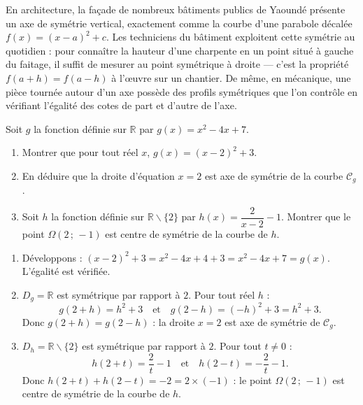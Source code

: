 \documentclass[11pt]{article}
\def\setminus{\mathbin{\backslash}}\let\smallsetminus\setminus
\begin{document}
\begin{savaistu}
En architecture, la façade de nombreux bâtiments publics de Yaoundé présente un axe de symétrie vertical, exactement comme la courbe d'une parabole décalée $f(x) = (x-a)^2 + c$. Les techniciens du bâtiment exploitent cette symétrie au quotidien : pour connaître la hauteur d'une charpente en un point situé à gauche du faitage, il suffit de mesurer au point symétrique à droite — c'est la propriété $f(a+h) = f(a-h)$ à l'œuvre sur un chantier. De même, en mécanique, une pièce tournée autour d'un axe possède des profils symétriques que l'on contrôle en vérifiant l'égalité des cotes de part et d'autre de l'axe.
\end{savaistu}

\begin{exercice}
Soit $g$ la fonction définie sur $\mathbb{R}$ par $g(x) = x^2 - 4x + 7$.
\begin{enumerate}
\item Montrer que pour tout réel $x$, $g(x) = (x-2)^2 + 3$.
\item En déduire que la droite d'équation $x = 2$ est axe de symétrie de la courbe $\mathcal{C}_g$.
\item Soit $h$ la fonction définie sur $\mathbb{R} \setminus \{2\}$ par $h(x) = \dfrac{2}{x-2} - 1$. Montrer que le point $\Omega(2\,;\,-1)$ est centre de symétrie de la courbe de $h$.
\end{enumerate}
\end{exercice}

\begin{corrige}
\begin{enumerate}
\item Développons : $(x-2)^2 + 3 = x^2 - 4x + 4 + 3 = x^2 - 4x + 7 = g(x)$. L'égalité est vérifiée.
\item $D_g = \mathbb{R}$ est symétrique par rapport à $2$. Pour tout réel $h$ :
\[ g(2+h) = h^2 + 3 \quad \text{et} \quad g(2-h) = (-h)^2 + 3 = h^2 + 3. \]
Donc $g(2+h) = g(2-h)$ : la droite $x = 2$ est axe de symétrie de $\mathcal{C}_g$.
\item $D_h = \mathbb{R} \setminus \{2\}$ est symétrique par rapport à $2$. Pour tout $t \neq 0$ :
\[ h(2+t) = \frac{2}{t} - 1 \quad \text{et} \quad h(2-t) = -\frac{2}{t} - 1. \]
Donc $h(2+t) + h(2-t) = -2 = 2 \times (-1)$ : le point $\Omega(2\,;\,-1)$ est centre de symétrie de la courbe de $h$.
\end{enumerate}
\end{corrige}
\end{document}

